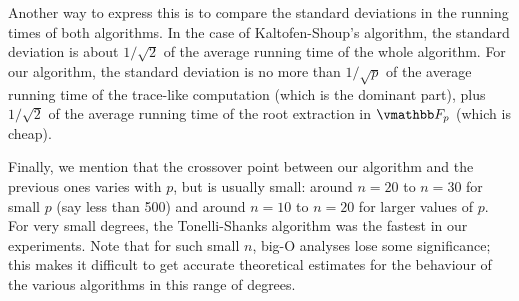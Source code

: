 Another way to express this is to compare the standard deviations in
the running times of both algorithms. In the case of Kaltofen-Shoup's
algorithm, the standard deviation is about $1/\sqrt{2}$ of the average
running time of the whole algorithm. For our algorithm, the standard
deviation is no more than $1/\sqrt{p}$ of the average running time of the
trace-like computation (which is the dominant part), plus $1/\sqrt{2}$
of the average running time of the root extraction in $\F_p$ (which is cheap).

Finally, we mention that the crossover point between our algorithm and
the previous ones varies with $p$, but is usually small: around $n=20$
to $n=30$ for small $p$ (say less than 500) and around $n=10$ to
$n=20$ for larger values of $p$. For very small degrees, the
Tonelli-Shanks algorithm was the fastest in our experiments.  Note
that for such small $n$, big-O analyses lose some significance; this
makes it difficult to get accurate theoretical estimates for the
behaviour of the various algorithms in this range of degrees.

 

